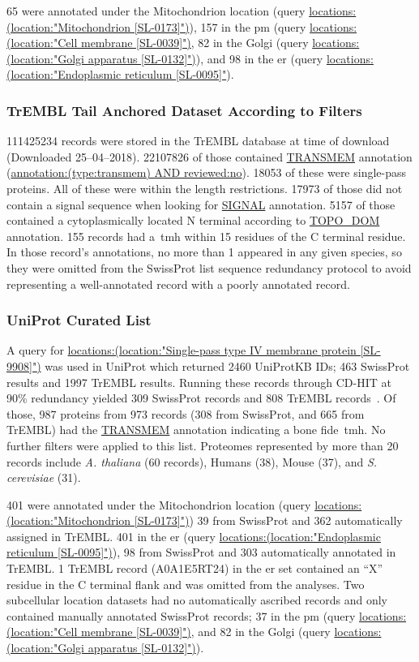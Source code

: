 65 were annotated under the Mitochondrion location (query \url{locations:(location:"Mitochondrion [SL-0173]")}), 157 in the \gls{pm} (query \url{locations:(location:"Cell membrane [SL-0039]")}, 82 in the Golgi (query \url{locations:(location:"Golgi apparatus [SL-0132]")}), and 98 in the \gls{er} (query \url{locations:(location:"Endoplasmic reticulum [SL-0095]"}).

\subsubsection{TrEMBL Tail Anchored Dataset According to Filters}
111425234 records were stored in the TrEMBL database at time of download (Downloaded 25--04--2018).
22107826 of those contained \url{TRANSMEM} annotation (\url{annotation:(type:transmem) AND reviewed:no}).
18053 of these were single-pass proteins.
All of these were within the length restrictions.
17973 of those did not contain a signal sequence when looking for \url{SIGNAL} annotation.
5157 of those contained a cytoplasmically located N terminal according to \url{TOPO_DOM} annotation.
155 records had a~\gls{tmh} within 15 residues of the C terminal residue.
In those record's annotations, no more than 1 appeared in any given species, so they were omitted from the SwissProt list sequence redundancy protocol to avoid representing a well-annotated record with a poorly annotated record.

\subsubsection{UniProt Curated List}
A query for \url{locations:(location:"Single-pass type IV membrane protein [SL-9908]")} was used in UniProt which returned 2460 UniProtKB IDs; 463 SwissProt results and 1997 TrEMBL results.
Running these records through CD-HIT at 90\% redundancy yielded 309 SwissProt records and 808 TrEMBL records~\cite{Huang2010, Wu2011}.
Of those, 987 proteins from 973 records (308 from SwissProt, and 665 from TrEMBL) had the \url{TRANSMEM} annotation indicating a bone fide~\gls{tmh}.
No further filters were applied to this list.
Proteomes represented by more than 20 records include \textit{A. thaliana} (60 records), Humans (38), Mouse (37), and \textit{S. cerevisiae} (31). %

401 were annotated under the Mitochondrion location (query \url{locations:(location:"Mitochondrion [SL-0173]")}) 39 from SwissProt and 362 automatically assigned in TrEMBL.
401 in the \gls{er} (query \url{locations:(location:"Endoplasmic reticulum [SL-0095]")}), 98 from SwissProt and 303 automatically annotated in TrEMBL.
1 TrEMBL record (A0A1E5RT24) in the \gls{er} set contained an ``X'' residue in the C terminal flank and was omitted from the analyses.
Two subcellular location datasets had no automatically ascribed records and only contained manually annotated SwissProt records; 37 in the \gls{pm} (query \url{locations:(location:"Cell membrane [SL-0039]")}, and 82 in the Golgi (query \url{locations:(location:"Golgi apparatus [SL-0132]")}).

